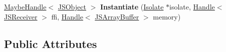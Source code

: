 \begin{DoxyCompactItemize}
\item 
\hyperlink{classv8_1_1internal_1_1_maybe_handle}{Maybe\+Handle}$<$ \hyperlink{classv8_1_1internal_1_1_j_s_object}{J\+S\+Object} $>$ {\bfseries Instantiate} (\hyperlink{classv8_1_1internal_1_1_isolate}{Isolate} $\ast$isolate, \hyperlink{classv8_1_1internal_1_1_handle}{Handle}$<$ \hyperlink{classv8_1_1internal_1_1_j_s_receiver}{J\+S\+Receiver} $>$ ffi, \hyperlink{classv8_1_1internal_1_1_handle}{Handle}$<$ \hyperlink{classv8_1_1internal_1_1_j_s_array_buffer}{J\+S\+Array\+Buffer} $>$ memory)\hypertarget{structv8_1_1internal_1_1wasm_1_1_wasm_module_a07383bfc70f388676f0a68609f2df96b}{}\label{structv8_1_1internal_1_1wasm_1_1_wasm_module_a07383bfc70f388676f0a68609f2df96b}

\end{DoxyCompactItemize}
\subsection*{Public Attributes}
